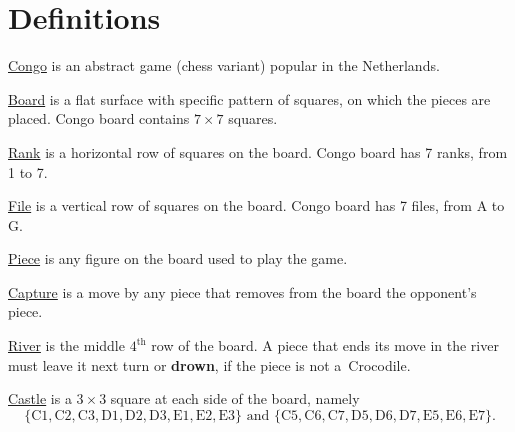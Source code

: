 \section{Definitions}

\vspace{0.5em}

\underline{Congo}
is an abstract game (chess variant) popular in the Netherlands.

\vspace{0.5em}

\underline{Board}
is a flat surface with specific pattern of squares, on which the pieces are
placed. Congo board contains $7 \times 7$ squares.

\vspace{0.5em}

\underline{Rank}
is a horizontal row of squares on the board. Congo board has 7 ranks, from
\textsf{1} to \textsf{7}.

\vspace{0.5em}

\underline{File}
is a vertical row of squares on the board. Congo board has 7 files, from
\textsf{A} to \textsf{G}.

\vspace{0.5em}

\underline{Piece}
is any figure on the board used to play the game.

\vspace{0.5em}

\underline{Capture}
is a move by any piece that removes from the board the opponent's piece.

\vspace{0.5em}

\underline{River}
is the middle $4^{\text{th}}$ row of the board. A piece that ends its move in
the river must leave it next turn or \textbf{drown}, if the piece is not
a~Crocodile.

\vspace{0.5em}

\underline{Castle}
is a $3 \times 3$ square at each side of the board, namely
\begin{equation*}
\{
    \text{C1}, \text{C2}, \text{C3},
    \text{D1}, \text{D2}, \text{D3},
    \text{E1}, \text{E2}, \text{E3}
\}
\text{ and }
\{
    \text{C5}, \text{C6}, \text{C7},
    \text{D5}, \text{D6}, \text{D7},
    \text{E5}, \text{E6}, \text{E7}
\}.
\end{equation*}
